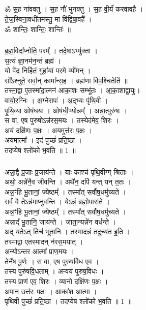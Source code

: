 \subsection{}
ॐ स॒ह ना॑ववतु । स॒ह नौ॑ भुनक्तु । स॒ह वी॒र्यं॑ करवावहै ।\\
ते॒ज॒स्विना॒वधी॑तमस्तु॒ मा वि॑द्विषा॒वहै᳚ ।\\
ॐ शान्तिः॒ शान्तिः॒ शान्तिः॑ ॥\\
\subsubsection{}
ब्र॒ह्म॒विदा᳚प्नोति॒ परम्᳚ । तदे॒षाऽभ्यु॑क्ता ।\\
स॒त्यं ज्ञा॒नम॑न॒न्तं ब्रह्म॑ ।\\
यो वे॑द॒ निहि॑तं॒ गुहा॑यां पर॒मे व्यो॑मन् ।\\
सो᳚ऽश्नुते॒ सर्वा॒न् कामा᳚न्स॒ह । ब्रह्म॑णा विप॒श्चितेति॑ ॥\\
तस्मा॒द्वा ए॒तस्मा॑दा॒त्मन॑ आका॒शः सम्भू॑तः । आ॒का॒शाद्वा॒युः।\\
वायो॒र॒ग्निः । अ॒ग्नेरापः॑ । अ॒द्भ्यः पृ॑थि॒वी ।\\
पृ॒थि॒व्या ओष॑धयः । ओष॑धी॒भ्योन्नम्᳚ । अन्ना॒त्पुरु॑षः ।\\
स वा, एष पुरुषोऽन्न॑रस॒मयः । तस्येद॑मेव॒ शिरः ।\\
अयं दक्षि॑णः प॒क्षः । अयमुत्त॑रः प॒क्षः ।\\
अयमात्मा᳚ । इदं पुच्छं॑ प्रति॒ष्ठा ।\\
तदप्येष श्लो॑को भ॒वति ॥ 1 ॥\\
\subsubsection{}
अन्ना॒द्वै प्र॒जाः प्र॒जाय॑न्ते । याः काश्च॑ पृथि॒वीग्ग् श्रिताः ।\\
अथो॒ अन्ने॑नै॒व जी॑वन्ति । अथै॑न॒ दपि॑ यन्त् यन् त॒तः ।\\
अन्न॒ꣳहि भू॒तानां॒ ज्येष्ठम्᳚ । तस्मा᳚त् सर्वौष॒धमु॑च्यते ।\\
सर्वं॒ वै तेऽन्न॑माप्नुवन्ति । येऽन्नं॒ ब्रह्मो॒पास॑ते ।\\
अन्न॒ꣳहि भू॒तानां॒ ज्येष्ठम्᳚ । तस्मा᳚त् सर्वौष॒धमु॑च्यते ।\\
अन्नाद्᳚ भू॒तानि॒ जाय॑न्ते । जाता॒न्यन्ने॑न वर्धन्ते ।\\
अद् यतेऽत् तिच॑ भूता॒नि । तस्मादन्नं तदुच्य॑त इ॒ति ।\\
तस्माद्वा एतस्मादन् न॑रस॒मयात् । \\
अन्योऽन्तर आत्मा᳚ प्राण॒मयः ।\\
तेनै॑ष पू॒र्णः । स वा, एष पुरुषवि॑ध ए॒व ।\\
तस्य पुरु॑षवि॒धताम् । अन्वयं॑ पुरुष॒विधः ।\\
तस्य प्राण॑ एव॒ शिरः । व्यानो दक्षि॑णः प॒क्षः ।\\
अपान उत्त॑रः प॒क्षः । आका॑श आ॒त्मा ।\\
पृथिवी पुच्छं॑ प्रति॒ष्ठा । तदप्येष श्लो॑को भ॒वति ॥ 1 ॥\\
